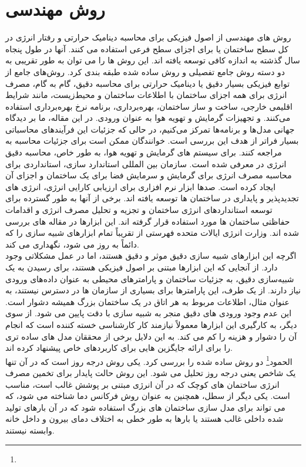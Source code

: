 \section{روش مهندسی}


روش های مهندسی از اصول فیزیکی برای محاسبه دینامیک حرارتی و رفتار انرژی در کل سطح ساختمان یا برای اجزای سطح فرعی استفاده می کنند. آنها در طول پنجاه سال گذشته به اندازه کافی توسعه یافته اند. این روش ها را می توان به طور تقریبی به دو دسته روش جامع تفصیلی و روش ساده شده طبقه بندی کرد. روش‌های جامع از توابع فیزیکی بسیار دقیق یا دینامیک حرارتی برای محاسبه دقیق، گام به گام، مصرف انرژی برای همه اجزای ساختمان با اطلاعات ساختمان و محیط‌زیست، مانند شرایط اقلیمی خارجی، ساخت و ساز ساختمان، بهره‌برداری، برنامه نرخ بهره‌برداری استفاده می‌کنند. و تجهیزات گرمایش و تهویه هوا به عنوان ورودی. در این مقاله، ما بر دیدگاه جهانی مدل‌ها و برنامه‌ها تمرکز می‌کنیم، در حالی که جزئیات این فرآیندهای محاسباتی بسیار فراتر از هدف این بررسی است. خوانندگان ممکن است برای جزئیات محاسبه به \cite{clarke2001energy} مراجعه کنند. برای سیستم های گرمایش و تهویه هوا، به طور خاص، محاسبه دقیق انرژی در \cite{mcquiston2004heating} معرفی شده است. سازمان بین المللی استاندارد سازی، استانداردی برای محاسبه مصرف انرژی برای گرمایش و سرمایش فضا برای یک ساختمان و اجزای آن ایجاد کرده است. صدها ابزار نرم افزاری برای ارزیابی کارایی انرژی، انرژی های تجدیدپذیر و پایداری در ساختمان ها توسعه یافته اند. برخی از آنها به طور گسترده برای توسعه استانداردهای انرژی ساختمان و تجزیه و تحلیل مصرف انرژی و اقدامات حفاظتی ساختمان ها مورد استفاده قرار گرفته اند. این ابزارها در مقاله های \cite{CRAWLEY2008661,al2001computer} بررسی شده اند. وزارت انرژی ایالات متحده فهرستی از تقریباً تمام ابزارهای شبیه سازی را که دائماً به روز می شود، نگهداری می کند.
\\
اگرچه این ابزارهای شبیه سازی دقیق موثر و دقیق هستند، اما در عمل مشکلاتی وجود دارد. از آنجایی که این ابزارها مبتنی بر اصول فیزیکی هستند، برای رسیدن به یک شبیه‌سازی دقیق، به جزئیات ساختمان و پارامترهای محیطی به عنوان داده‌های ورودی نیاز دارند. از یک طرف، این پارامترها برای بسیاری از سازمان ها در دسترس نیستند، به عنوان مثال، اطلاعات مربوط به هر اتاق در یک ساختمان بزرگ همیشه دشوار است. این عدم وجود ورودی های دقیق منجر به شبیه سازی با دقت پایین می شود. از سوی دیگر، به کارگیری این ابزارها معمولاً نیازمند کار کارشناسی خسته کننده است که انجام آن را دشوار و هزینه را کم می کند. به این دلایل برخی از محققان مدل های ساده تری را برای ارائه جایگزین هایی برای کاربردهای خاص پیشنهاد کرده اند.
\\
الحمود\footnote{} \cite{al2001computer} دو روش ساده شده را بررسی کرد. یکی روش درجه روز است که در آن تنها یک شاخص یعنی درجه روز تحلیل می شود. این روش حالت پایدار برای تخمین مصرف انرژی ساختمان های کوچک که در آن انرژی مبتنی بر پوشش غالب است، مناسب است. یکی دیگر از سطل، همچنین به عنوان روش فرکانس دما شناخته می شود، که می تواند برای مدل سازی ساختمان های بزرگ استفاده شود که در آن بارهای تولید شده داخلی غالب هستند یا بارها به طور خطی به اختلاف دمای بیرون و داخل خانه وابسته نیستند.
